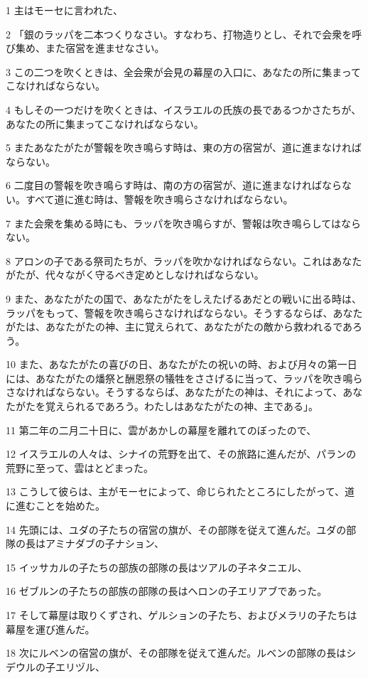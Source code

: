 \par 1 主はモーセに言われた、
\par 2 「銀のラッパを二本つくりなさい。すなわち、打物造りとし、それで会衆を呼び集め、また宿営を進ませなさい。
\par 3 この二つを吹くときは、全会衆が会見の幕屋の入口に、あなたの所に集まってこなければならない。
\par 4 もしその一つだけを吹くときは、イスラエルの氏族の長であるつかさたちが、あなたの所に集まってこなければならない。
\par 5 またあなたがたが警報を吹き鳴らす時は、東の方の宿営が、道に進まなければならない。
\par 6 二度目の警報を吹き鳴らす時は、南の方の宿営が、道に進まなければならない。すべて道に進む時は、警報を吹き鳴らさなければならない。
\par 7 また会衆を集める時にも、ラッパを吹き鳴らすが、警報は吹き鳴らしてはならない。
\par 8 アロンの子である祭司たちが、ラッパを吹かなければならない。これはあなたがたが、代々ながく守るべき定めとしなければならない。
\par 9 また、あなたがたの国で、あなたがたをしえたげるあだとの戦いに出る時は、ラッパをもって、警報を吹き鳴らさなければならない。そうするならば、あなたがたは、あなたがたの神、主に覚えられて、あなたがたの敵から救われるであろう。
\par 10 また、あなたがたの喜びの日、あなたがたの祝いの時、および月々の第一日には、あなたがたの燔祭と酬恩祭の犠牲をささげるに当って、ラッパを吹き鳴らさなければならない。そうするならば、あなたがたの神は、それによって、あなたがたを覚えられるであろう。わたしはあなたがたの神、主である」。
\par 11 第二年の二月二十日に、雲があかしの幕屋を離れてのぼったので、
\par 12 イスラエルの人々は、シナイの荒野を出て、その旅路に進んだが、パランの荒野に至って、雲はとどまった。
\par 13 こうして彼らは、主がモーセによって、命じられたところにしたがって、道に進むことを始めた。
\par 14 先頭には、ユダの子たちの宿営の旗が、その部隊を従えて進んだ。ユダの部隊の長はアミナダブの子ナション、
\par 15 イッサカルの子たちの部族の部隊の長はツアルの子ネタニエル、
\par 16 ゼブルンの子たちの部族の部隊の長はヘロンの子エリアブであった。
\par 17 そして幕屋は取りくずされ、ゲルションの子たち、およびメラリの子たちは幕屋を運び進んだ。
\par 18 次にルベンの宿営の旗が、その部隊を従えて進んだ。ルベンの部隊の長はシデウルの子エリヅル、
